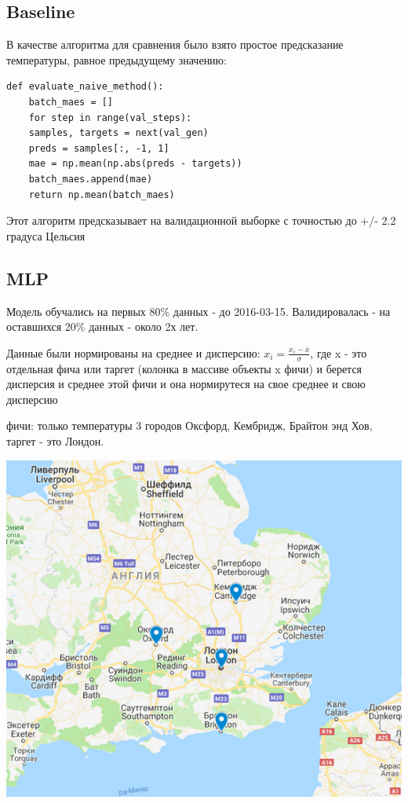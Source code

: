 \documentclass[11pt]{article}
\begin{document}
\subsection{Baseline}
\label{sec:org914ebeb}
В качестве алгоритма для сравнения было взято простое предсказание температуры, равное предыдущему значению:
\begin{verbatim}
def evaluate_naive_method():
    batch_maes = []
    for step in range(val_steps):
	samples, targets = next(val_gen)
	preds = samples[:, -1, 1]
	mae = np.mean(np.abs(preds - targets))
	batch_maes.append(mae)
    return np.mean(batch_maes)
\end{verbatim}

Этот алгоритм предсказывает на валидационной выборке с точностью до +/- 2.2 градуса Цельсия

\subsection{MLP}
\label{sec:orgb794ba7}
Модель обучались на первых 80\% данных - до 2016-03-15. Валидировалась - на оставшихся 20\% данных - около 2х лет.

Данные были нормированы на среднее и дисперсию: \(x_{i} = \frac{x_{i} - \overline{x}}{\sigma}\), где x - это отдельная
фича или таргет (колонка в массиве объекты x фичи) и берется дисперсия и среднее этой фичи и она нормирутеся на свое
среднее и свою дисперсию

фичи: только температуры 3 городов Оксфорд, Кембридж, Брайтон энд Хов, таргет - это Лондон.

\begin{center}
\includegraphics[width=15cm]{./pics/map city predict.png}
\end{center} 
\end{document}
